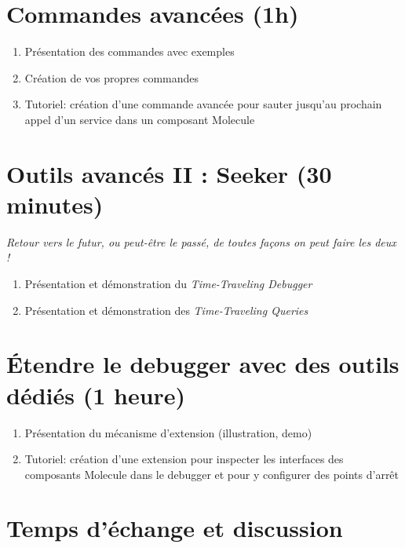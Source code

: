\documentclass[manuscript, language=english, language=french, nonacm]{acmart}
\begin{document}
\section{Commandes avancées (1h)}

\begin{enumerate}
    \item Présentation des commandes avec exemples
    \item Création de vos propres commandes
    \item Tutoriel: création d'une commande avancée pour sauter jusqu'au prochain appel d'un service dans un composant Molecule
\end{enumerate}


\section{Outils avancés II : Seeker (30 minutes)}

\textit{Retour vers le futur, ou peut-être le passé, de toutes façons on peut faire les deux !}

\begin{enumerate}
    \item Présentation et démonstration du \textit{Time-Traveling Debugger}
    \item Présentation et démonstration des \textit{Time-Traveling Queries}
\end{enumerate}


\section{Étendre le debugger avec des outils dédiés (1 heure)}

\begin{enumerate}
    \item Présentation du mécanisme d'extension (illustration, demo)
    \item Tutoriel: création d'une extension pour inspecter les interfaces des composants Molecule dans le debugger et pour y configurer des points d'arrêt
\end{enumerate}


\section{Temps d'échange et discussion}
\end{document}
